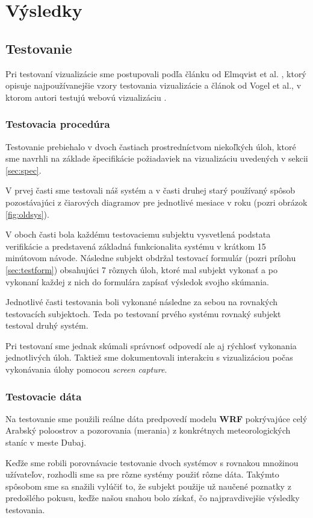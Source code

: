 \chapter{Výsledky}

\section{Testovanie}
Pri testovaní vizualizácie sme postupovali podľa článku od Elmqvist et al. \cite{Patterns}, ktorý opisuje najpoužívanejšie vzory testovania vizualizácie a článok od Vogel et al., v ktorom autori testujú webovú vizualizáciu \cite{WebBasedUserTest}.

\subsection{Testovacia procedúra}
Testovanie prebiehalo v dvoch častiach prostredníctvom niekoľkých úloh, ktoré sme navrhli na základe špecifikácie požiadaviek na vizualizáciu uvedených v sekcii \ref{sec:spec}.

V prvej časti sme testovali náš systém a v časti druhej starý používaný spôsob pozostávajúci z čiarových diagramov pre jednotlivé mesiace v roku (pozri obrázok \ref{fig:oldsys}).

V oboch časti bola každému testovaciemu subjektu vysvetlená podstata verifikácie a predstavená základná funkcionalita systému v krátkom 15 minútovom návode. Následne subjekt obdržal testovací formulár (pozri prílohu \ref{sec:testform}) obsahujúci 7 rôznych úloh, ktoré mal subjekt vykonať a po vykonaní každej z nich do formulára zapísať výsledok svojho skúmania.

Jednotlivé časti testovania boli vykonané následne za sebou na rovnakých testovacích subjektoch. Teda po testovaní prvého systému rovnaký subjekt testoval druhý systém.

Pri testovaní sme jednak skúmali správnosť odpovedí ale aj rýchlosť vykonania jednotlivých úloh. Taktiež sme dokumentovali interakciu s vizualizáciou počas vykonávania úlohy pomocou \textit{screen capture}.

\subsection{Testovacie dáta}
Na testovanie sme použili reálne dáta predpovedí modelu \textbf{WRF} pokrývajúce celý Arabský poloostrov a pozorovania (merania) z konkrétnych meteorologických staníc v meste Dubaj.

Keďže sme robili porovnávacie testovanie dvoch systémov s rovnakou množinou užívateľov, rozhodli sme sa pre rôzne systémy použiť rôzne dáta. Takýmto spôsobom sme sa snažili vylúčiť to, že subjekt použije už naučené poznatky z predošlého pokusu, keďže našou snahou bolo získať, čo najpravdivejšie výsledky testovania. 

